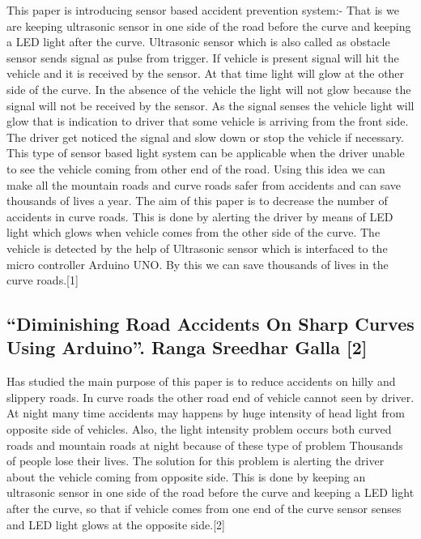 \documentclass[conference]{IEEEtran}
\begin{document}
    This paper is introducing sensor based accident prevention system:- That is we are keeping ultrasonic sensor in one side of the road
    before the curve and keeping a LED light after the curve. Ultrasonic sensor which is also called as obstacle sensor sends signal as
    pulse from trigger. If vehicle is present signal will hit the vehicle and it is received by the sensor. At that time light will glow at the
    other side of the curve. In the absence of the vehicle the light will not glow because the signal will not be received by the sensor. As
    the signal senses the vehicle light will glow that is indication to driver that some vehicle is arriving from the front side. The driver
    get noticed the signal and slow down or stop the vehicle if necessary. This type of sensor based light system can be applicable when
    the driver unable to see the vehicle coming from other end of the road. Using this idea we can make all the mountain roads and
    curve roads safer from accidents and can save thousands of lives a year. The aim of this paper is to decrease the number of accidents
    in curve roads. This is done by alerting the driver by means of LED light which glows when vehicle comes from the other side of
    the curve. The vehicle is detected by the help of Ultrasonic sensor which is interfaced to the micro controller Arduino UNO. By this
    we can save thousands of lives in the curve roads.[1]
    
    \subsection{“Diminishing Road Accidents On Sharp Curves Using Arduino”. Ranga Sreedhar Galla [2]}
    Has studied the main purpose of this paper is to reduce accidents on hilly and slippery roads. In curve roads the other road end of
    vehicle cannot seen by driver. At night many time accidents may happens by huge intensity of head light from opposite side of
    vehicles. Also, the light intensity problem occurs both curved roads and mountain roads at night because of these type of problem
    Thousands of people lose their lives. The solution for this problem is alerting the driver about the vehicle coming from opposite
    side. This is done by keeping an ultrasonic sensor in one side of the road before the curve and keeping a LED light after the curve,
    so that if vehicle comes from one end of the curve sensor senses and LED light glows at the opposite side.[2]
    
\end{document}
